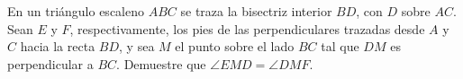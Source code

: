 En un triángulo escaleno $ABC$ se traza la bisectriz interior $BD$, con $D$ sobre $AC$. \newline 
Sean $E$ y $F$, respectivamente, los pies de las perpendiculares trazadas desde $A$ y $C$ hacia la recta $BD$, y sea $M$ el punto sobre el lado $BC$ tal que $DM$ es perpendicular a $BC$. Demuestre que $\angle EMD = \angle DMF$.
